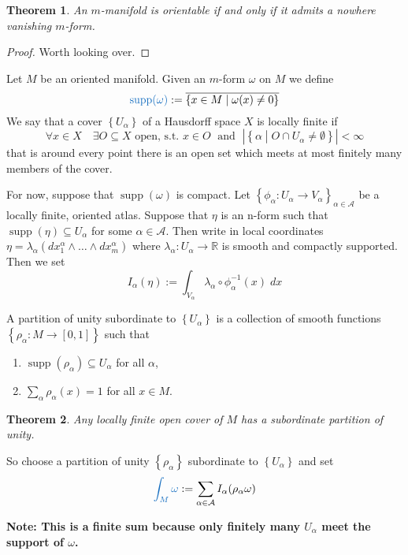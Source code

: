 \documentclass[11pt]{article}
\newcommand{\defeq}{:=}
\DeclareMathOperator{\supp}{\mathrm{supp}}
\newcommand{\relmiddle}[1]{\mathrel{}\middle#1\mathrel{}}
\newcommand{\rmv}{\relmiddle|}
\newcommand{\R}{\mathbb{R}}
\newenvironment{defin}
	{\begin{mdframed}[backgroundcolor=white, roundcorner=5pt, linewidth=1pt, linecolor=RoyalBlue]
		\setlength{\parindent}{0pt}}
	{\end{mdframed}}
\newcommand{\mdf}[1]{{\color{RoyalBlue} #1}}
\newenvironment{note}
	{\begin{mdframed}[backgroundcolor=white, linecolor=RubineRed, roundcorner=5pt, linewidth=1pt]\bfseries{Note:}\normalfont
	\setlength{\parindent}{0pt}}
	{\end{mdframed}}
\newtheorem{theorem}{Theorem}[section]
\begin{document}
\begin{theorem}
An $m$-manifold is orientable if and only if it admits a nowhere vanishing $m$-form.
\end{theorem}

\begin{proof}
Worth looking over.
\end{proof}

\begin{defin}
Let $M$ be an oriented manifold.
Given an $m$-form $\omega$ on $M$ we define
\[
\mdf{\supp(\omega)}\defeq\overline{\left\{ x\in M \rmv \omega(x) \neq 0\right\}}
\]
We say that a cover $\left\{ U_\alpha\right\}$ of a Hausdorff space $X$ is \mdf{locally finite} if
\[
	\forall x \in X \quad \exists O\subseteq X\text{ open, s.t. }x\in O \; \text{ and } \; \left|\left\{ \alpha \rmv O\cap U_\alpha\neq\emptyset\right\}\right|< \infty
\]
that is around every point there is an open set which meets at most finitely many members of the cover.
\end{defin}

For now, suppose that $\supp(\omega)$ is compact.
Let $\left\{ \phi_\alpha: U_\alpha \to V_\alpha\right\}_{\alpha\in\mathcal{A}}$ be a locally finite, oriented atlas.
Suppose that $\eta$ is an n-form such that $\supp(\eta)\subseteq U_\alpha$ for some $\alpha\in\mathcal{A}$.
Then write in local coordinates $\eta = \lambda_\alpha(dx_1^\alpha \wedge \dots \wedge dx_m^\alpha)$ where $\lambda_\alpha:U_\alpha\to\R$ is smooth and compactly supported.
Then we set
\[
	I_\alpha(\eta)\defeq \int_{V_\alpha} \lambda_\alpha \circ \phi_\alpha^{-1}(x) \; dx
\]

\begin{defin}
	A \mdf{partition of unity subordinate to} $\left\{ U_\alpha\right\}$ is a collection of smooth functions $\left\{ \rho_\alpha: M \to [0, 1]\right\}$ such that
	\begin{enumerate}
		\item $\supp(\rho_\alpha)\subseteq U_\alpha$ for all $\alpha$,
		\item $\sum_{\alpha}\rho_\alpha(x)=1$ for all $x\in M$.
	\end{enumerate}
\end{defin}

\begin{theorem}
Any locally finite open cover of $M$ has a subordinate partition of unity.
\end{theorem}

So choose a partition of unity $\left\{ \rho_\alpha\right\}$ subordinate to $\left\{ U_\alpha\right\}$ and set
\[
	\mdf{\int_M \omega} \defeq \sum_{\alpha\in\mathcal{A}} I_\alpha(\rho_\alpha \omega)
\]
\begin{note}
	This is a finite sum because only finitely many $U_\alpha$ meet the support of $\omega$.
\end{note}
\end{document}
